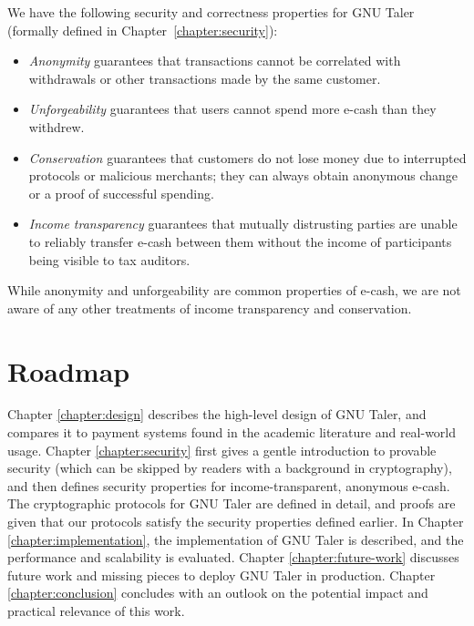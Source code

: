 
We have the following security and correctness properties for GNU Taler
(formally defined in Chapter~\ref{chapter:security}):
\begin{itemize}
  \item \emph{Anonymity} guarantees that transactions cannot be correlated with withdrawals or
    other transactions made by the same customer.
  \item \emph{Unforgeability} guarantees that users cannot spend more e-cash than they withdrew.
  \item \emph{Conservation} guarantees that customers do not lose money due to
    interrupted protocols or malicious merchants; they can always obtain
    anonymous change or a proof of successful spending.
  \item \emph{Income transparency} guarantees that mutually distrusting parties
    are unable to reliably transfer e-cash between them without the income of
    participants being visible to tax auditors.
\end{itemize}

While anonymity and unforgeability are common properties of e-cash, we are not
aware of any other treatments of income transparency and conservation.


\section{Roadmap}

Chapter \ref{chapter:design} describes the high-level design of GNU Taler, and
compares it to payment systems found in the academic literature and real-world
usage.  Chapter \ref{chapter:security} first gives a gentle introduction to
provable security (which can be skipped by readers with a background in
cryptography), and then defines security properties for income-transparent,
anonymous e-cash.  The cryptographic protocols for GNU Taler are defined in
detail, and proofs are given that our protocols satisfy the security
properties defined earlier.  In Chapter \ref{chapter:implementation}, the
implementation of GNU Taler is described, and the performance and scalability
is evaluated.  Chapter \ref{chapter:future-work} discusses future work and
missing pieces to deploy GNU Taler in production.  Chapter
\ref{chapter:conclusion} concludes with an outlook on the potential impact and
practical relevance of this work.

